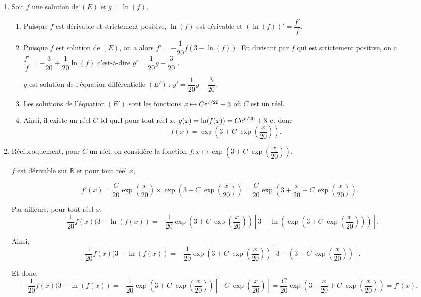 \documentclass[11pt,fleqn, openany]{book} %
\begin{document}
\begin{solution}  \hspace{0pt}

\begin{enumerate}\item Soit \(f\) une solution de \((E)\) et \(g=\ln(f)\).
\begin{enumerate} \item Puisque \(f\) est dérivable et strictement positive, \(\ln(f)\) est dérivable et \((\ln(f))'=\dfrac{f'}{f}\).
\item  Puisque \(f\) est solution de \((E)\), on a alors \(f'=-\dfrac{1}{20}f(3-\ln(f))\). En divisant par \(f\) qui est strictement positive, on a $\dfrac{f'}{f}=-\dfrac{3}{20}+\dfrac{1}{20}\ln(f)$ c'est-à-dire \(g'= \dfrac{1}{20}g-\dfrac{3}{20}\) .

 \(g\) est solution de l'équation différentielle \((E')\,:\,y'=\dfrac{1}{20}y-\dfrac{3}{20}\).
\item  Les solutions de l'équation \((E')\) sont les fonctions \(x\mapsto C\mathrm{e}^{x/20}+3\) où \(C\) est un réel.
\item  Ainsi, il existe un réel \(C\) tel quel pour tout réel \(x\), \(g(x)=\ln(f(x))= C\mathrm{e}^{x/20}+3\) et donc
\[f(x)=\exp\left(3+C\;\exp\left(\dfrac{x}{20}\right)\right).\]\end{enumerate}

\item  Réciproquement, pour \(C\) un réel, on considère la fonction \(f:x\mapsto \exp\left(3+C\;\exp\left(\dfrac{x}{20}\right)\right)\). 

\(f\) est dérivable sur \(\mathbb{R}\) et pour tout réel \(x\),

\[f'(x)=\dfrac{C}{20}\exp\left(\dfrac{x}{20}\right)\times \exp\left(3+C\;\exp\left(\dfrac{x}{20}\right)\right)=\dfrac{C}{20}\exp\left(3+\dfrac{x}{20}+C\;\exp\left(\dfrac{x}{20}\right)\right).\]

Par ailleurs, pour tout réel \(x\),
\[-\dfrac{1}{20} f(x) (3-\ln(f(x))=-\dfrac{1}{20}\exp\left(3+C\;\exp\left(\dfrac{x}{20}\right)\right) \left[3-\ln\left(\exp\left(3+C\;\exp\left(\dfrac{x}{20}\right)\right)\right)\right].\]

Ainsi,
\[-\dfrac{1}{20} f(x) (3-\ln(f(x))=-\dfrac{1}{20}\exp\left(3+C\;\exp\left(\dfrac{x}{20}\right)\right) \left[3-\left(3+C\;\exp\left(\dfrac{x}{20}\right)\right)\right].\]

Et donc,
\[-\dfrac{1}{20} f(x) (3-\ln(f(x))=-\dfrac{1}{20}\exp\left(3+C\;\exp\left(\dfrac{x}{20}\right)\right) \left[-C\;\exp\left(\dfrac{x}{20}\right)\right]=\dfrac{C}{20}\exp\left(3+\dfrac{x}{20}+C\;\exp\left(\dfrac{x}{20}\right)\right)=f'(x).\]


\end{enumerate}
\end{solution}
\end{document}
